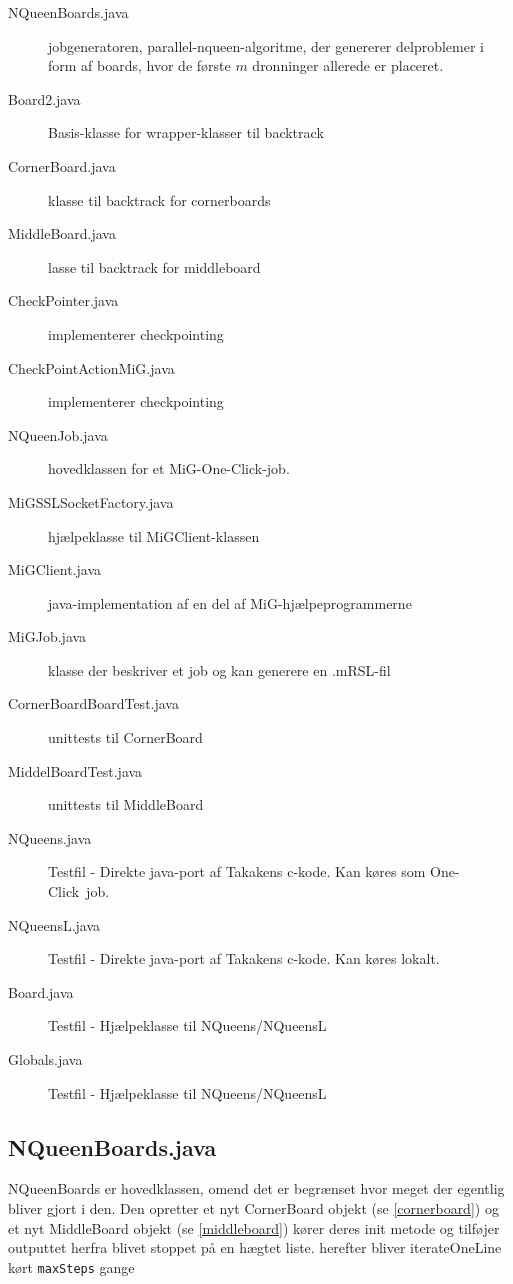 \documentclass[draft,a4paper,11pt]{article}
\newcommand{\mig}{MiG}
\newcommand{\oc}{One-Click}
\begin{document}
\begin{description}
	\item[NQueenBoards.java] jobgeneratoren, parallel-nqueen-algoritme, der genererer delproblemer i form af boards, hvor de første $m$ dronninger allerede er placeret. 
	\item[Board2.java] Basis-klasse for wrapper-klasser til backtrack
	\item[CornerBoard.java] klasse til backtrack for cornerboards
	\item[MiddleBoard.java] lasse til backtrack for middleboard
	\item[CheckPointer.java] implementerer checkpointing
	\item[CheckPointActionMiG.java] implementerer checkpointing
	\item[NQueenJob.java] hovedklassen for et \mig-\oc-job. 
	\item[MiGSSLSocketFactory.java] hjælpeklasse til MiGClient-klassen
	\item[MiGClient.java] java-implementation af en del af \mig-hjælpeprogrammerne
	\item[MiGJob.java] klasse der beskriver et job og kan generere en .mRSL-fil
	\item[CornerBoardBoardTest.java] unittests til CornerBoard
	\item[MiddelBoardTest.java] unittests til MiddleBoard
	\item[NQueens.java] Testfil - Direkte java-port af Takakens c-kode. Kan køres som \oc\ job.
	\item[NQueensL.java] Testfil - Direkte java-port af Takakens c-kode. Kan køres lokalt.
	\item[Board.java] Testfil - Hjælpeklasse til NQueens/NQueensL
	\item[Globals.java] Testfil - Hjælpeklasse til NQueens/NQueensL
\end{description}

\subsection{NQueenBoards.java}

NQueenBoards er hovedklassen, omend det er begrænset hvor meget der egentlig
bliver gjort i den. Den opretter et nyt CornerBoard objekt (se
\ref{cornerboard}) og et nyt MiddleBoard objekt (se \ref{middleboard})
kører deres init metode og tilføjer outputtet herfra blivet stoppet på en hægtet
liste. 
herefter bliver iterateOneLine kørt \texttt{maxSteps} gange
\end{document}
